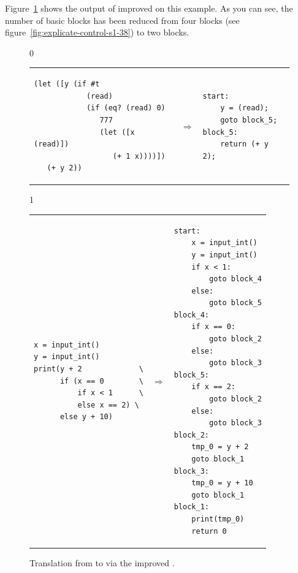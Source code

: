 \documentclass[7x10]{TimesAPriori_MIT}%
\def\racketEd{0}
\def\pythonEd{1}
\def\edition{1}
\newcommand{\pythonColor}[0]{}
\numberwithin{theorem}{chapter}
\numberwithin{definition}{chapter}
\numberwithin{equation}{chapter}
\begin{document}
Figure~\ref{fig:explicate-control-challenge} shows the output of
improved  on this example.  As you can
see, the number of basic blocks has been reduced from four blocks (see
figure~\ref{fig:explicate-control-s1-38}) to two blocks.

\begin{figure}[tbp]
  \begin{tcolorbox}[colback=white]
    {\if\edition\racketEd        
\begin{tabular}{lll}
\begin{minipage}{0.4\textwidth}
\begin{lstlisting}
(let ([y (if #t
            (read)
            (if (eq? (read) 0)
               777
               (let ([x (read)])
                  (+ 1 x))))])
   (+ y 2))
\end{lstlisting}
\end{minipage}
&
$\Rightarrow$
&
\begin{minipage}{0.55\textwidth}
\begin{lstlisting}
start:
    y = (read);
    goto block_5;
block_5:
    return (+ y 2);
\end{lstlisting}
\end{minipage}
\end{tabular} 
\fi}
{\if\edition\pythonEd\pythonColor
\begin{tabular}{lll}
\begin{minipage}{0.4\textwidth}
\begin{lstlisting}
x = input_int()
y = input_int()
print(y + 2             \
      if (x == 0        \
          if x < 1      \
          else x == 2) \
      else y + 10)
\end{lstlisting}
\end{minipage}
&
$\Rightarrow$
&
\begin{minipage}{0.55\textwidth}
\begin{lstlisting}
start:
    x = input_int()
    y = input_int()
    if x < 1:
        goto block_4
    else:
        goto block_5
block_4:
    if x == 0:
        goto block_2
    else:
        goto block_3
block_5:
    if x == 2:
        goto block_2
    else:
        goto block_3
block_2:
    tmp_0 = y + 2
    goto block_1
block_3:
    tmp_0 = y + 10
    goto block_1
block_1:
    print(tmp_0)
    return 0
\end{lstlisting}
\end{minipage}
\end{tabular} 
\fi}
  \end{tcolorbox}

  \caption{Translation from \LangIf{} to \LangCIf{}
  via the improved .}
\label{fig:explicate-control-challenge}
\end{figure}
\end{document}
